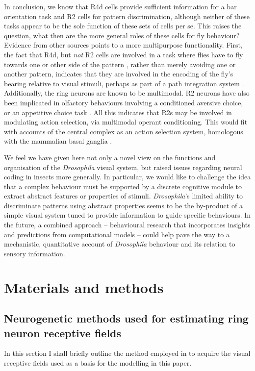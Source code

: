 \documentclass[10pt]{article}
\begin{document}
In conclusion, we know that R4d cells provide sufficient information for a bar orientation task and R2 cells for pattern discrimination, although neither of these tasks appear to be the sole function of these sets of cells per se.
This raises the question, what then are the more general roles of these cells for fly behaviour?
Evidence from other sources points to a more multipurpose functionality.
First, the fact that R4d, but \emph{not} R2 cells are involved in a task where flies have to fly towards one or other side of the pattern \cite{Guo2015}, rather than merely avoiding one or another pattern, indicates that they are involved in the encoding of the fly's bearing relative to visual stimuli, perhaps as part of a path integration system \cite{Seelig2015}.
Additionally, the ring neurons are known to be multimodal.
R2 neurons have also been implicated in olfactory behaviours involving a conditioned aversive choice, or an appetitive choice task \cite{Azanchi2013, Zhang2013,Zhang2015}. All this indicates that R2s may be involved in modulating action selection, via multimodal operant conditioning.
This would fit with accounts of the central complex as an action selection system, homologous with the mammalian basal ganglia \cite{Strausfeld2013}.

We feel we have given here not only a novel view on the functions and organisation of the \emph{Drosophila} visual system, but raised issues regarding neural coding in insects more generally. In particular, we would like to challenge the idea that a complex behaviour must be supported by a discrete cognitive module to extract abstract features or properties of stimuli.
\emph{Drosophila}'s limited ability to discriminate patterns using abstract properties seems to be the by-product of a simple visual system tuned to provide information to guide specific behaviours.
In the future, a combined approach -- behavioural research that incorporates insights and predictions from computational models -- could help pave the way to a mechanistic, quantitative account of \emph{Drosophila} behaviour and its relation to sensory information.


\section{Materials and methods}

\subsection{Neurogenetic methods used for estimating ring neuron receptive fields}
\label{sec:methods:seelig}
In this section I shall briefly outline the method employed in \cite{Seelig2013} to acquire the visual receptive fields used as a basis for the modelling in this paper.
\end{document}
